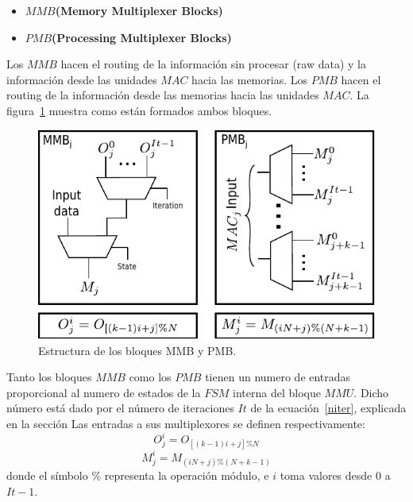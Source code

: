 \begin{itemize}
 \item \textbf{$MMB$(Memory Multiplexer Blocks)}
  \item \textbf{$PMB$(Processing Multiplexer Blocks)}
\end{itemize}

Los $MMB$ hacen el routing de la información sin procesar (raw data) y la
información desde las unidades $MAC$ hacia las memorias. 
Los $PMB$ hacen el routing de la información desde las memorias hacia las
unidades $MAC$. La figura~\ref{mmu_structure} muestra como están formados ambos
bloques.

\begin{figure}
\centering
\includegraphics{muxes_cont}
\caption{Estructura de los bloques MMB y PMB.}\label{mmu_structure}
\end{figure}

Tanto los bloques $MMB$ como los $PMB$ tienen un numero de entradas proporcional
al numero de estados de la $FSM$ interna del bloque $MMU$. Dicho número está
dado por el número de iteraciones $It$ de la ecuación~\ref{niter}, explicada en la
sección%
Las entradas a sus multiplexores se definen respectivamente:
\begin{equation}%
  O_j^i = O_{[(k-1)i+j]\%N}
\end{equation}
\begin{equation}%
  M_j^i = M_{(iN+j)\%(N+k-1)}
\end{equation}
donde el símbolo $ \% $ representa la operación módulo, e $i$ toma valores desde
$0$ a $It-1$.

